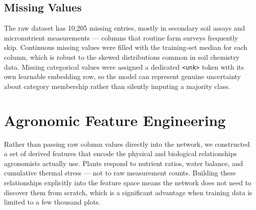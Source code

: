 \documentclass[conference,10pt,letterpaper]{IEEEtran}
\begin{document}
\subsection{Missing Values}
The raw dataset has 10,205 missing entries, mostly in secondary soil assays and micronutrient measurements --- columns that routine farm surveys frequently skip. Continuous missing values were filled with the training-set median for each column, which is robust to the skewed distributions common in soil chemistry data. Missing categorical values were assigned a dedicated \texttt{<unk>} token with its own learnable embedding row, so the model can represent genuine uncertainty about category membership rather than silently imputing a majority class.

\section{Agronomic Feature Engineering}

Rather than passing raw column values directly into the network, we constructed a set of derived features that encode the physical and biological relationships agronomists actually use. Plants respond to nutrient ratios, water balance, and cumulative thermal stress --- not to raw measurement counts. Building these relationships explicitly into the feature space means the network does not need to discover them from scratch, which is a significant advantage when training data is limited to a few thousand plots.
\end{document}

